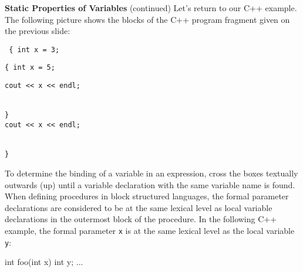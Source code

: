 \begin{minipage}[t]{\sw}
\slidenumber
\LARGE
{\bf Static Properties of Variables} (continued)\exx
Let's return to our C++ example.
The following picture shows the blocks
of the C++ program fragment given on the previous slide:\exx
{\tt
\verb'{ int x = 3;'\\
  \hspace*{2em}%
  \begin{fminipage}{4.5in}
  \verb'{ int x = 5;'\\
    \hspace*{2em}%
    \begin{fminipage}{3.5in}
    \verb'cout << x << endl;'
    \end{fminipage}\\
  \verb'}'\\
  \verb'cout << x << endl;'
  \end{fminipage}\\
\verb'}'\exx
} %
To determine the binding of a variable in an expression,
cross the boxes textually outwards (up)
until a variable declaration with the same variable name
is found.\\[2ex]
When defining procedures in block structured languages,
the formal parameter declarations are considered
to be at the same lexical level
as local variable declarations
in the outermost block of the procedure.
In the following C++ example,
the formal parameter \verb'x' is at the same lexical level
as the local variable \verb'y':
\begin{qv}
int foo(int x) {
    int y;
    ...
}
\end{qv}
\end{minipage}
\clearpage
